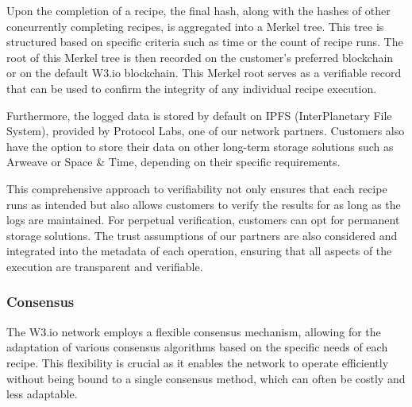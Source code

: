 \documentclass[11pt]{article}
\begin{document}
Upon the completion of a recipe, the final hash, along with the hashes of other concurrently completing recipes, is aggregated into a Merkel tree. This tree is structured based on specific criteria such as time or the count of recipe runs. The root of this Merkel tree is then recorded on the customer's preferred blockchain or on the default W3.io blockchain. This Merkel root serves as a verifiable record that can be used to confirm the integrity of any individual recipe execution.

Furthermore, the logged data is stored by default on IPFS (InterPlanetary File System), provided by Protocol Labs, one of our network partners. Customers also have the option to store their data on other long-term storage solutions such as Arweave or Space \& Time, depending on their specific requirements.

This comprehensive approach to verifiability not only ensures that each recipe runs as intended but also allows customers to verify the results for as long as the logs are maintained. For perpetual verification, customers can opt for permanent storage solutions. The trust assumptions of our partners are also considered and integrated into the metadata of each operation, ensuring that all aspects of the execution are transparent and verifiable.

\subsubsection{Consensus}
The W3.io network employs a flexible consensus mechanism, allowing for the adaptation of various consensus algorithms based on the specific needs of each recipe. This flexibility is crucial as it enables the network to operate efficiently without being bound to a single consensus method, which can often be costly and less adaptable.
\end{document}

